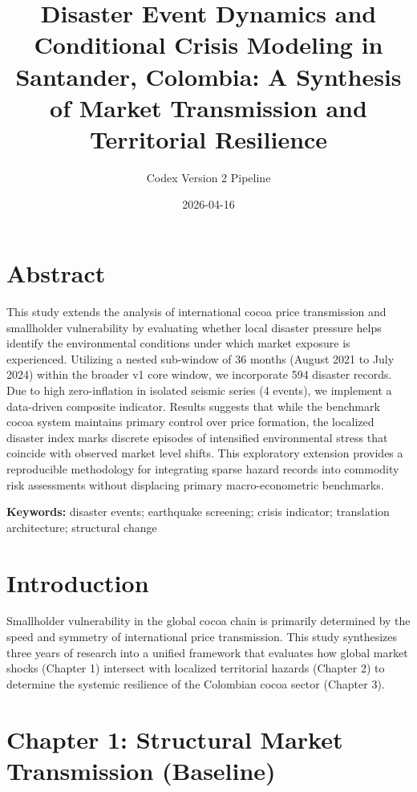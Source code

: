 \documentclass[
  american,
  11pt,
]{article}
\title{Disaster Event Dynamics and Conditional Crisis Modeling in
Santander, Colombia: A Synthesis of Market Transmission and Territorial
Resilience}
\author{Codex Version 2 Pipeline}
\date{2026-04-16}
\begin{document}
\maketitle

{
\setcounter{tocdepth}{3}
\tableofcontents
}
\section{Abstract}\label{abstract}

This study extends the analysis of international cocoa price
transmission and smallholder vulnerability by evaluating whether local
disaster pressure helps identify the environmental conditions under
which market exposure is experienced. Utilizing a nested sub-window of
36 months (August 2021 to July 2024) within the broader v1 core window,
we incorporate 594 disaster records. Due to high zero-inflation in
isolated seismic series (4 events), we implement a data-driven composite
indicator. Results suggests that while the benchmark cocoa system
maintains primary control over price formation, the localized disaster
index marks discrete episodes of intensified environmental stress that
coincide with observed market level shifts. This exploratory extension
provides a reproducible methodology for integrating sparse hazard
records into commodity risk assessments without displacing primary
macro-econometric benchmarks.

\textbf{Keywords:} disaster events; earthquake screening; crisis
indicator; translation architecture; structural change

\section{Introduction}\label{introduction}

Smallholder vulnerability in the global cocoa chain is primarily
determined by the speed and symmetry of international price
transmission. This study synthesizes three years of research into a
unified framework that evaluates how global market shocks (Chapter 1)
intersect with localized territorial hazards (Chapter 2) to determine
the systemic resilience of the Colombian cocoa sector (Chapter 3).

\section{Chapter 1: Structural Market Transmission
(Baseline)}\label{chapter-1-structural-market-transmission-baseline}
\end{document}
